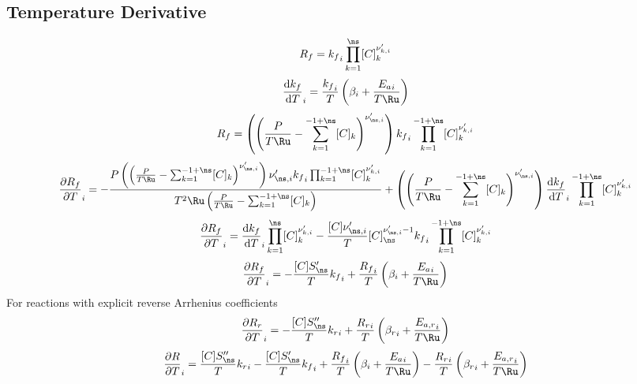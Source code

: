 \documentclass[a4paper,10pt]{article}
\begin{document}
\subsection{Temperature Derivative}
\begin{dmath} {R_f} = {k_f}_{i} \prod_{k=1}^{\ns} [C]_{k}^{\nu^{\prime}_{k,i}}\end{dmath} 
\begin{dmath} \frac{\text{d} {k_f} }{\text{d} T }_{i} = \frac{{k_f}_{i}}{T} \left(\beta_{i} + \frac{{E_{a}}_{i}}{T \Ru}\right)\end{dmath} 
\begin{dmath} {R_f} = \left(\left(\frac{P}{T \Ru} - \sum_{k=1}^{-1 + \ns} [C]_{k}\right)^{\nu^{\prime}_{\ns,i}}\right) {k_f}_{i} \prod_{k=1}^{-1 + \ns} [C]_{k}^{\nu^{\prime}_{k,i}}\end{dmath} 
\begin{dmath} \frac{\partial {R_f} }{\partial T }_{i} = - \frac{P \left(\left(\frac{P}{T \Ru} - \sum_{k=1}^{-1 + \ns} [C]_{k}\right)^{\nu^{\prime}_{\ns,i}}\right) \nu^{\prime}_{\ns,i} {k_f}_{i} \prod_{k=1}^{-1 + \ns} [C]_{k}^{\nu^{\prime}_{k,i}}}{T^{2} \Ru \left(\frac{P}{T \Ru} - \sum_{k=1}^{-1 + \ns} [C]_{k}\right)} + \left(\left(\frac{P}{T \Ru} - \sum_{k=1}^{-1 + \ns} [C]_{k}\right)^{\nu^{\prime}_{\ns,i}}\right) \frac{\text{d} {k_f} }{\text{d} T }_{i} \prod_{k=1}^{-1 + \ns} [C]_{k}^{\nu^{\prime}_{k,i}}\end{dmath} 
\begin{dmath} \frac{\partial {R_f} }{\partial T }_{i} = \frac{\text{d} {k_f} }{\text{d} T }_{i} \prod_{k=1}^{\ns} [C]_{k}^{\nu^{\prime}_{k,i}} - \frac{[C] \nu^{\prime}_{\ns,i}}{T} [C]_{\ns}^{\nu^{\prime}_{\ns,i} - 1} {k_f}_{i} \prod_{k=1}^{-1 + \ns} [C]_{k}^{\nu^{\prime}_{k,i}}\end{dmath} 
\begin{dmath} \frac{\partial {R_f} }{\partial T }_{i} = - \frac{[C] S^{\prime}_{\ns}}{T} {k_f}_{i} + \frac{{R_f}_{i}}{T} \left(\beta_{i} + \frac{{E_{a}}_{i}}{T \Ru}\right)\end{dmath} 
For reactions with explicit reverse Arrhenius coefficients
\begin{dmath} \frac{\partial {R_r} }{\partial T }_{i} = - \frac{[C] S^{\prime\prime}_{\ns}}{T} {k_r}_{i} + \frac{{R_r}_{i}}{T} \left({\beta_r}_{i} + \frac{{E_{a,r}}_{i}}{T \Ru}\right)\end{dmath} 
\begin{dmath} \frac{\partial R }{\partial T }_{i} = \frac{[C] S^{\prime\prime}_{\ns}}{T} {k_r}_{i} - \frac{[C] S^{\prime}_{\ns}}{T} {k_f}_{i} + \frac{{R_f}_{i}}{T} \left(\beta_{i} + \frac{{E_{a}}_{i}}{T \Ru}\right) - \frac{{R_r}_{i}}{T} \left({\beta_r}_{i} + \frac{{E_{a,r}}_{i}}{T \Ru}\right)\end{dmath} 
\end{document}
